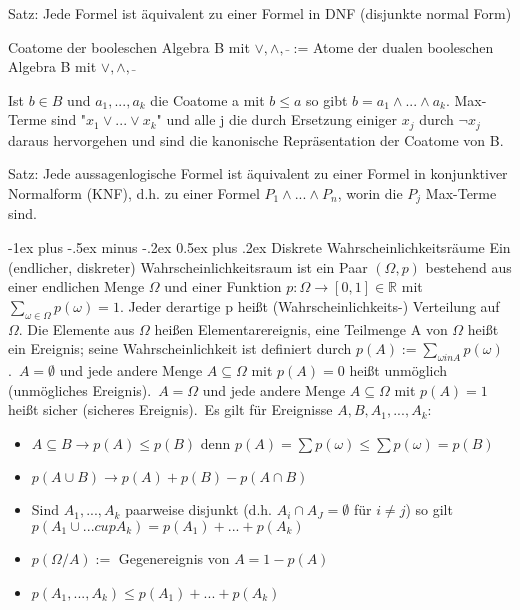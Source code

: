 \documentclass[10pt,landscape]{article}
\makeatletter
\renewcommand{\section}{\@startsection{section}{1}{0mm}%
                                {-1ex plus -.5ex minus -.2ex}%
                                {0.5ex plus .2ex}%
                                {\normalfont\large\bfseries}}
\makeatother
\begin{document}
\begin{multicols}{3}
Satz: Jede Formel ist äquivalent zu einer Formel in DNF (disjunkte normal Form)

Coatome der booleschen Algebra B mit $\vee, \wedge, \bar{}$ := Atome der dualen booleschen Algebra B mit $\vee, \wedge, \bar{}$

Ist $b\in B$ und $a_1,...,a_k$ die Coatome a mit $b\leq a$ so gibt $b=a_1 \wedge ... \wedge a_k$. Max-Terme sind "$x_1\vee ... \vee x_k$" und alle j die durch Ersetzung einiger $x_j$ durch $\neg x_j$ daraus hervorgehen und sind die kanonische Repräsentation der Coatome von B.

Satz: Jede aussagenlogische Formel ist äquivalent zu einer Formel in konjunktiver Normalform (KNF), d.h. zu einer Formel $P_1\wedge ... \wedge P_n$, worin die $P_j$ Max-Terme sind.

\section{Diskrete Wahrscheinlichkeitsräume}
Ein (endlicher, diskreter) Wahrscheinlichkeitsraum ist ein Paar $(\Omega, p)$ bestehend aus einer endlichen Menge $\Omega$ und einer Funktion $p:\Omega \rightarrow [0,1]\in \mathbb{R}$ mit $\sum_{\omega \in \Omega} p(\omega)=1$. Jeder derartige p heißt (Wahrscheinlichkeits-) Verteilung auf $\Omega$. Die Elemente aus $\Omega$ heißen Elementarereignis, eine Teilmenge A von $\Omega$ heißt ein Ereignis; seine Wahrscheinlichkeit ist definiert durch $p(A):=\sum_{\omega in A} p(\omega)$.\
$A=\emptyset$ und jede andere Menge $A\subseteq \Omega$ mit $p(A)=0$ heißt unmöglich (unmögliches Ereignis).\
$A=\Omega$ und jede andere Menge $A\subseteq \Omega$ mit $p(A)=1$ heißt sicher (sicheres Ereignis).\
Es gilt für Ereignisse $A,B,A_1,...,A_k$:
\begin{itemize}
    \item $A\subseteq B \rightarrow p(A)\leq p(B)$ denn $p(A)=\sum p(\omega) \leq \sum p(\omega) = p(B)$
    \item $p(A\cup B) \rightarrow p(A)+p(B)-p(A\cap B)$
    \item Sind $A_1,...,A_k$ paarweise disjunkt (d.h. $A_i \cap A_J=\emptyset$ für $i\not =j$) so gilt $p(A_1 \cup ... cup A_k)= p(A_1)+...+p(A_k)$
    \item $p(\Omega / A):=$ Gegenereignis von $A=1-p(A)$
    \item $p(A_1,...,A_k) \leq p(A_1)+...+p(A_k)$
\end{itemize}


\end{multicols}
\end{document}
